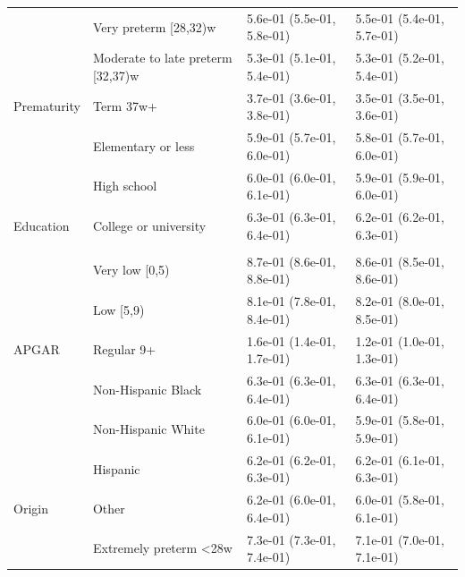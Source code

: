 \documentclass[10pt, twoside, parskip=half]{article}
\begin{document}
\begin{table}[t]
\begin{tabular}{llll}
 & Very preterm [28,32)w & 5.6e-01 (5.5e-01, 5.8e-01) & 5.5e-01 (5.4e-01, 5.7e-01)\\

 & Moderate to late preterm [32,37)w & 5.3e-01 (5.1e-01, 5.4e-01) & 5.3e-01 (5.2e-01, 5.4e-01)\\

\multirow{-4}{*}{\raggedright\arraybackslash \hspace{1em}Prematurity} & Term 37w+ & 3.7e-01 (3.6e-01, 3.8e-01) & 3.5e-01 (3.5e-01, 3.6e-01)\\
\cmidrule{1-4}
 & Elementary or less & 5.9e-01 (5.7e-01, 6.0e-01) & 5.8e-01 (5.7e-01, 6.0e-01)\\

 & High school & 6.0e-01 (6.0e-01, 6.1e-01) & 5.9e-01 (5.9e-01, 6.0e-01)\\

\multirow{-3}{*}{\raggedright\arraybackslash \hspace{1em}Education} & College or university & 6.3e-01 (6.3e-01, 6.4e-01) & 6.2e-01 (6.2e-01, 6.3e-01)\\
\cmidrule{1-4}
\addlinespace[0.3em]
\multicolumn{4}{l}{\textbf{2000-2005}}\\
 & Very low [0,5) & 8.7e-01 (8.6e-01, 8.8e-01) & 8.6e-01 (8.5e-01, 8.6e-01)\\

 & Low [5,9) & 8.1e-01 (7.8e-01, 8.4e-01) & 8.2e-01 (8.0e-01, 8.5e-01)\\

\multirow{-3}{*}{\raggedright\arraybackslash \hspace{1em}APGAR} & Regular 9+ & 1.6e-01 (1.4e-01, 1.7e-01) & 1.2e-01 (1.0e-01, 1.3e-01)\\
\cmidrule{1-4}
 & Non-Hispanic Black & 6.3e-01 (6.3e-01, 6.4e-01) & 6.3e-01 (6.3e-01, 6.4e-01)\\

 & Non-Hispanic White & 6.0e-01 (6.0e-01, 6.1e-01) & 5.9e-01 (5.8e-01, 5.9e-01)\\

 & Hispanic & 6.2e-01 (6.2e-01, 6.3e-01) & 6.2e-01 (6.1e-01, 6.3e-01)\\

\multirow{-4}{*}{\raggedright\arraybackslash \hspace{1em}Origin} & Other & 6.2e-01 (6.0e-01, 6.4e-01) & 6.0e-01 (5.8e-01, 6.1e-01)\\
\cmidrule{1-4}
 & Extremely preterm <28w & 7.3e-01 (7.3e-01, 7.4e-01) & 7.1e-01 (7.0e-01, 7.1e-01)\\


\end{tabular}
\end{table}
\end{document}

